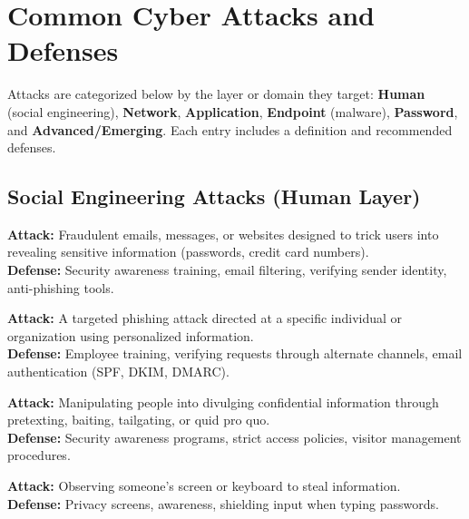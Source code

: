 \documentclass[11pt,a4paper]{article}
\begin{document}
\section{Common Cyber Attacks and Defenses}

\begin{conceptbox}[Overview]
Attacks are categorized below by the layer or domain they target: \textbf{Human} (social engineering), \textbf{Network}, \textbf{Application}, \textbf{Endpoint} (malware), \textbf{Password}, and \textbf{Advanced/Emerging}. Each entry includes a definition and recommended defenses.
\end{conceptbox}

\subsection{Social Engineering Attacks (Human Layer)}

\begin{alertbox}[Phishing]
\textbf{Attack:} Fraudulent emails, messages, or websites designed to trick users into revealing sensitive information (passwords, credit card numbers).\\
\textbf{Defense:} Security awareness training, email filtering, verifying sender identity, anti-phishing tools.
\end{alertbox}

\begin{alertbox}
\textbf{Attack:} A targeted phishing attack directed at a specific individual or organization using personalized information.\\
\textbf{Defense:} Employee training, verifying requests through alternate channels, email authentication (SPF, DKIM, DMARC).
\end{alertbox}

\begin{alertbox}
\textbf{Attack:} Manipulating people into divulging confidential information through pretexting, baiting, tailgating, or quid pro quo.\\
\textbf{Defense:} Security awareness programs, strict access policies, visitor management procedures.
\end{alertbox}

\begin{alertbox}
\textbf{Attack:} Observing someone's screen or keyboard to steal information.\\
\textbf{Defense:} Privacy screens, awareness, shielding input when typing passwords.
\end{alertbox}
\end{document}
